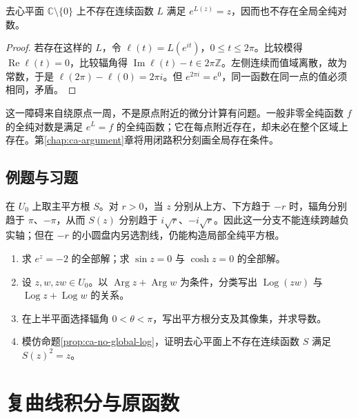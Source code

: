 \documentclass[UTF8,12pt,a4paper,fontset=fandol]{ctexbook}
\begin{document}
\begin{proposition}
\label{prop:ca-no-global-log}
去心平面 $\mathbb{C}\setminus\{0\}$ 上不存在连续函数 $L$ 满足 $e^{L(z)}=z$，因而也不存在全局全纯对数。
\end{proposition}
\begin{proof}
若存在这样的 $L$，令 $\ell(t)=L(e^{it})$，$0\le t\le2\pi$。比较模得 $\operatorname{Re}\ell(t)=0$，比较辐角得 $\operatorname{Im}\ell(t)-t\in2\pi\mathbb{Z}$。左侧连续而值域离散，故为常数，于是 $\ell(2\pi)-\ell(0)=2\pi i$。但 $e^{2\pi i}=e^0$，同一函数在同一点的值必须相同，矛盾。
\end{proof}

这一障碍来自绕原点一周，不是原点附近的微分计算有问题。一般非零全纯函数 $f$ 的全纯对数是满足 $e^L=f$ 的全纯函数；它在每点附近存在，却未必在整个区域上存在。第\ref{chap:ca-argument}章将用闭路积分刻画全局存在条件。

\section{例题与习题}

\begin{example}[一个平方根分支的边界值]
在 $U_0$ 上取主平方根 $S$。对 $r>0$，当 $z$ 分别从上方、下方趋于 $-r$ 时，辐角分别趋于 $\pi$、$-\pi$，从而 $S(z)$ 分别趋于 $i\sqrt r$、$-i\sqrt r$。因此这一分支不能连续跨越负实轴；但在 $-r$ 的小圆盘内另选割线，仍能构造局部全纯平方根。
\end{example}

\begin{enumerate}
  \item\label{ex:ca-exp-solutions} 求 $e^z=-2$ 的全部解；求 $\sin z=0$ 与 $\cosh z=0$ 的全部解。
  \item\label{ex:ca-log-product} 设 $z,w,zw\in U_0$。以 $\operatorname{Arg}z+\operatorname{Arg}w$ 为条件，分类写出 $\operatorname{Log}(zw)$ 与 $\operatorname{Log}z+\operatorname{Log}w$ 的关系。
  \item\label{ex:ca-square-root-domain} 在上半平面选择辐角 $0<\theta<\pi$，写出平方根分支及其像集，并求导数。
  \item\label{ex:ca-no-square-root} 模仿命题\ref{prop:ca-no-global-log}，证明去心平面上不存在连续函数 $S$ 满足 $S(z)^2=z$。
\end{enumerate}

\chapter{复曲线积分与原函数}
\label{chap:ca-integration}
\end{document}
